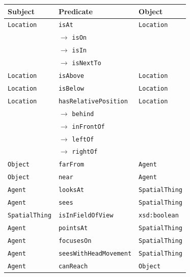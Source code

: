 \documentclass[compress,xcolor=table]{beamer}
\newcommand{\concept}[1]{{\scriptsize \texttt{#1}}}
\begin{document}
{
\begin{frame}{}
        \centering
        \scriptsize

        \begin{tabular}{p{1.5cm}lp{2cm}}
            Subject & Predicate  & Object  \\ 
            \hline
            \concept{Location} & \concept{isAt}  &  \concept{Location}  \\ 
                               &  $\rightarrow$ \concept{isOn}  &   \\ 
                               &  $\rightarrow$ \concept{isIn}  &   \\ 
                               &  $\rightarrow$ \concept{isNextTo}  &   \\ 

            \concept{Location}  & \concept{isAbove}  &  \concept{Location} \\ 
            \concept{Location}  & \concept{isBelow}  & \concept{Location} \\
            \hline
            \concept{Location}  & \concept{hasRelativePosition}  & \concept{Location}  \\ 
                                   & 	$\rightarrow$ \concept{behind} & \\ 
                                      &  $\rightarrow$ \concept{inFrontOf}  & \\ 
                                         &  $\rightarrow$ \concept{leftOf}  &  \\ 
                                            &  $\rightarrow$ \concept{rightOf}  & 	 \\ 
            \concept{Object}  & \concept{farFrom}  &  \concept{Agent} \\ 
            \concept{Object}  & \concept{near}  &  \concept{Agent} \\

            \hline
            \concept{Agent}  & \concept{looksAt}  & \concept{SpatialThing} \\
            \concept{Agent}  & \concept{sees}  &  \concept{SpatialThing}  \\ 
            \concept{SpatialThing}  & \concept{isInFieldOfView}  & \concept{xsd:boolean}  \\ 
            \concept{Agent}  & \concept{pointsAt}  & \concept{SpatialThing} \\ 
            \concept{Agent}  & \concept{focusesOn}  &  \concept{SpatialThing}  \\ 
            \concept{Agent} & \concept{seesWithHeadMovement} &  \concept{SpatialThing} \\
            \concept{Agent} & \concept{canReach} &  \concept{Object} \\ 

        \end{tabular}

\end{frame}
}
\end{document}
